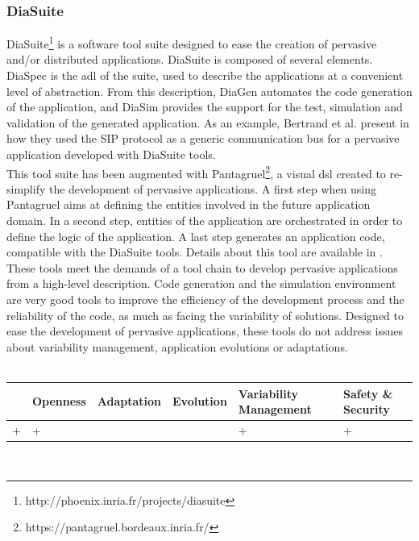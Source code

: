 \subsubsection{DiaSuite}
DiaSuite\footnote{http://phoenix.inria.fr/projects/diasuite} is a software tool suite designed to ease the creation of pervasive and/or distributed applications. DiaSuite\cite{CASSOU:2010} is composed of several elements. DiaSpec is the \gls{adl} of the suite, used to describe the applications at a convenient level of abstraction. From this description, DiaGen automates the code generation of the application, and DiaSim provides the support for the test, simulation and validation of the generated application. As an example, Bertrand et al. present in \cite{BERTRAN:2010} how they used the SIP protocol as a generic communication bus for a pervasive application developed with DiaSuite tools.\\
This tool suite has been augmented with Pantagruel\footnote{https://pantagruel.bordeaux.inria.fr/}, a visual \gls{dsl} created to re-simplify the development of pervasive applications. A first step when using Pantagruel aims at defining the entities involved in the future application domain. In a second step, entities of the application are orchestrated in order to define the logic of the application. A last step generates an application code, compatible with the DiaSuite tools. Details about this tool are available in \cite{DREY:2009}.\\

These tools meet the demands of a tool chain to develop pervasive applications from a high-level description. Code generation and the simulation environment are very good tools to improve the efficiency of the development process and the reliability of the code, as much as facing the variability of solutions. Designed to ease the development of pervasive applications, these tools do not address issues about variability management, application evolutions or adaptations.\\
\\
\begin{tabular}{ >{\centering}m{}| >{\centering}m{} >{\centering}m{}| >{\centering}m{} >{\centering}m{}| >{\centering\arraybackslash}m{}}
{\tiny Interoperability} & {\tiny Openness} & {\tiny Adaptation} & {\tiny Evolution} & {\tiny Variability Management} & {\tiny Safety \& Security}\\
 \hline
 + & + &  &  & + & + \\ 
  \hline
\end{tabular}\\


